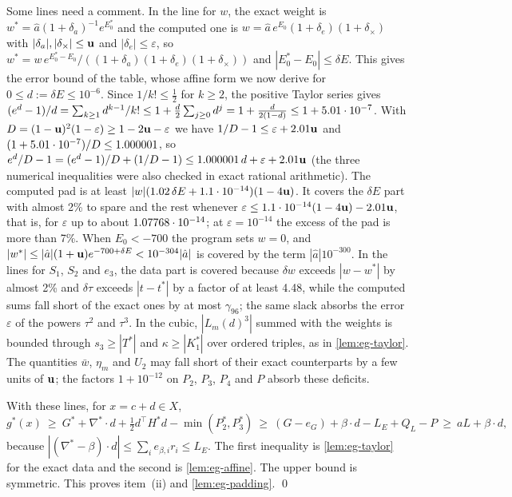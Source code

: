 Some lines need a comment.
In the line for $w$, the exact weight is $w^*=\hat a(1+\delta_a)^{-1}e^{E^*_0}$ and the computed one is $w=\hat a\,e^{E_0}(1+\delta_e)(1+\delta_\times)$ with $|\delta_a|,|\delta_\times|\le\mathbf{u}$ and $|\delta_e|\le\varepsilon$, so $w^*=w\,e^{E^*_0-E_0}/((1+\delta_a)(1+\delta_e)(1+\delta_\times))$ and $|E^*_0-E_0|\le\delta E$.
This gives the error bound of the table, whose affine form we now derive for $0\le d:=\delta E\le10^{-6}$.
Since $1/k!\le\frac12$ for $k\ge2$, the positive Taylor series gives $(e^d-1)/d=\sum_{k\ge1}d^{k-1}/k!\le1+\frac d2\sum_{j\ge0}d^j=1+\frac d{2(1-d)}\le1+5.01\cdot 10^{-7}$.
With $D=(1-\mathbf{u})^2(1-\varepsilon)\ge1-2\mathbf{u}-\varepsilon$ we have $1/D-1\le\varepsilon+2.01\mathbf{u}$ and $(1+5.01\cdot 10^{-7})/D\le1.000001$, so $e^d/D-1=(e^d-1)/D+(1/D-1)\le1.000001\,d+\varepsilon+2.01\mathbf{u}$ (the three numerical inequalities were also checked in exact rational arithmetic).
The computed pad is at least $|w|(1.02\,\delta E+1.1\cdot10^{-14})(1-4\mathbf{u})$.
It covers the $\delta E$ part with almost 2\% to spare and the rest whenever $\varepsilon\le1.1\cdot10^{-14}(1-4\mathbf{u})-2.01\mathbf{u}$, that is, for $\varepsilon$ up to about $1.07768\cdot 10^{-14}$; at $\varepsilon=10^{-14}$ the excess of the pad is more than 7\%.
When $E_0<-700$ the program sets $w=0$, and $|w^*|\le|\hat a|(1+\mathbf{u})e^{-700+\delta E}<10^{-304}|\hat a|$ is covered by the term $|\hat a|10^{-300}$.
In the lines for $S_1$, $S_2$ and $e_3$, the data part is covered because $\delta w$ exceeds $|w-w^*|$ by almost 2\% and $\delta\tau$ exceeds $|t-t^*|$ by a factor of at least 4.48, while the computed sums fall short of the exact ones by at most $\gamma_{96}$; the same slack absorbs the error $\varepsilon$ of the powers $\tau^2$ and $\tau^3$.
In the cubic, $|L_m(d)^3|$ summed with the weights is bounded through $s_3\ge|T^*|$ and $\kappa\ge|K^*_1|$ over ordered triples, as in \cref{lem:eg-taylor}.
The quantities $\bar w$, $\eta_m$ and $U_2$ may fall short of their exact counterparts by a few units of $\mathbf{u}$; the factors $1+10^{-12}$ on $P_2$, $P_3$, $P_4$ and $P$ absorb these deficits.

With these lines, for $x=c+d\in X$,
\begin{equation*}
  g^*(x)\ \ge\ G^*+\nabla^*\cdot d+\tfrac12d^\top H^*d-\min(P_2^*,P_3^*)
  \ \ge\ (G-e_G)+\beta\cdot d-L_E+Q_L-P\ \ge\ aL+\beta\cdot d ,
\end{equation*}
because $|(\nabla^*-\beta)\cdot d|\le\sum_ie_{\beta,i}r_i\le L_E$.
The first inequality is \cref{lem:eg-taylor} for the exact data and the second is \cref{lem:eg-affine}.
The upper bound is symmetric.
This proves item~(ii) and \cref{lem:eg-padding}. \qed

